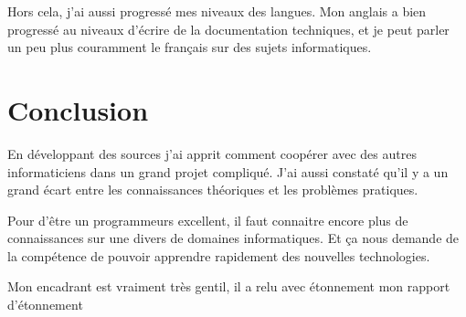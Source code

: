 \documentclass[a4paper, 11pt]{article}
\begin{document}
Hors cela, j'ai aussi progressé mes niveaux des langues. Mon anglais a bien
progressé au niveaux d'écrire de la documentation techniques, et je peut parler
un peu plus couramment le français sur des sujets informatiques.

\section{Conclusion}
\label{sec:conclusion}
En développant des sources j'ai apprit comment coopérer avec des autres
informaticiens dans un grand projet compliqué. J'ai aussi constaté qu'il 
y a un grand écart entre les connaissances théoriques et les problèmes pratiques.

Pour d'être un programmeurs excellent, il faut connaitre encore plus de
connaissances sur une divers de domaines informatiques. Et ça nous demande de
la compétence de pouvoir apprendre rapidement des nouvelles technologies.

Mon encadrant est vraiment très gentil, il a relu avec étonnement mon rapport d'étonnement


\end{document}
